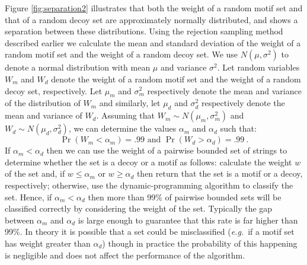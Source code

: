 Figure \ref{fig:separation2} illustrates that both the weight of a random motif set and that of a random decoy set are approximately normally distributed, and shows a separation between these distributions.  Using the rejection sampling method described earlier we calculate the mean and standard deviation of the weight of a random motif set and the weight of a random decoy set. We use $N(\mu, \sigma^2)$ to denote a normal distribution with mean $\mu$ and variance $\sigma^2$.  Let random variables $W_m$ and $W_d$ denote the weight of a random motif set and the weight of a random decoy set, respectively. Let $\mu_m$ and $\sigma_m^2$ respectively denote the mean and variance of the distribution of $W_m$ and similarly, let $\mu_d$ and $\sigma^2_d$ respectively denote the mean and variance of $W_d$.  Assuming that $W_m \sim N(\mu_m, \sigma_m^2)$ and $W_d \sim N(\mu_d, \sigma_d^2)$, we can determine the values $\alpha_m$ and $\alpha_d$ such that: $$\Pr(W_m < \alpha_m) = .99 \mbox{ and } \Pr(W_d > \alpha_d) = .99~.$$ If $\alpha_m < \alpha_d$ then we can use the weight of a pairwise bounded set of strings to determine whether the set is a decoy or a motif as follows: calculate the weight $w$ of the set and, if $w \leq \alpha_m$ or  $w \geq \alpha_d$ then return that the set is a motif or a decoy, respectively; otherwise, use the dynamic-programming algorithm to classify the set.  Hence, if $\alpha_m < \alpha_d$ then more than 99\% of pairwise bounded sets will be classified correctly by considering the weight of the set.  Typically the gap between $\alpha_m$ and $\alpha_d$ is large enough to guarantee that this rate is far higher than 99\%.  In theory it is possible that a set could be misclassified ({\it e.g.}\ if a motif set has weight greater than $\alpha_d$) though in practice the probability of this happening is negligible and does not affect the performance of the algorithm.



